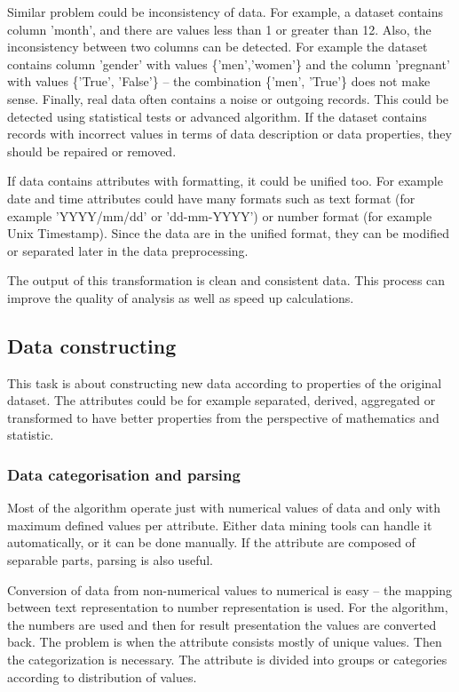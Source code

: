 \documentclass[thesis=M,english]{FITthesis}[2012/10/20]
\begin{document}
Similar problem could be inconsistency of data.\cite[43]{Chapman2000crisp} For example, a dataset contains column 'month', and there are values less than 1 or greater than 12. Also, the inconsistency between two columns can be detected. For example the dataset contains column 'gender' with values \{'men','women'\} and the column 'pregnant' with values \{'True', 'False'\} -- the combination \{'men', 'True'\} does not make sense. Finally, real data often contains a noise or outgoing records. This could be detected using statistical tests or advanced algorithm. If the dataset contains records with incorrect values in terms of data description or data properties, they should be repaired or removed. 

If data contains attributes with formatting, it could be unified too.\cite[43]{Chapman2000crisp} For example date and time attributes could have many formats such as text format (for example 'YYYY/mm/dd' or 'dd-mm-YYYY') or number format (for example Unix Timestamp). Since the data are in the unified format, they can be modified or separated later in the data preprocessing.

The output of this transformation is clean and consistent data. This process can improve the quality of analysis as well as speed up calculations. 

\subsection{Data constructing}

This task is about constructing new data according to properties of the original dataset. The attributes could be for example separated, derived, aggregated or transformed to have better properties from the perspective of mathematics and statistic. 

\subsubsection{Data categorisation and parsing}

Most of the algorithm operate just with numerical values of data and only with maximum defined values per attribute. Either data mining tools can handle it automatically, or it can be done manually. If the attribute are composed of separable parts, parsing is also useful.\cite[44]{Chapman2000crisp}

Conversion of data from non-numerical values to numerical is easy -- the mapping between text representation to number representation is used. For the algorithm, the numbers are used and then for result presentation the values are converted back. The problem is when the attribute consists mostly of unique values. Then the categorization is necessary. The attribute is divided into groups or categories according to distribution of values.\cite[45]{Chapman2000crisp}
\end{document}
